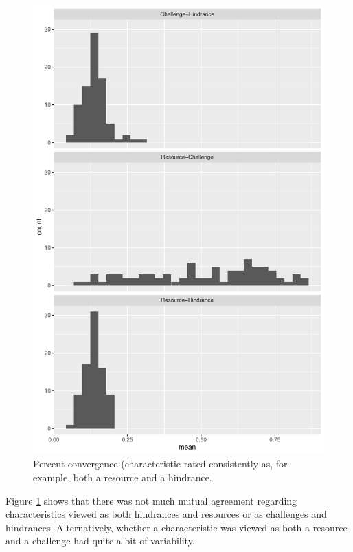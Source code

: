 \documentclass[
  man]{apa6}
\begin{document}
\begin{figure}
\centering
\includegraphics{Submission_ResourceCount_files/figure-latex/percagree-1.pdf}
\caption{\label{fig:percagree}Percent convergence (characteristic rated consistently as, for example, both a resource and a hindrance.}
\end{figure}

Figure \ref{fig:percagree} shows that there was not much mutual agreement regarding characteristics viewed as both hindrances and resources or as challenges and hindrances. Alternatively, whether a characteristic was viewed as both a resource and a challenge had quite a bit of variability.
\end{document}
